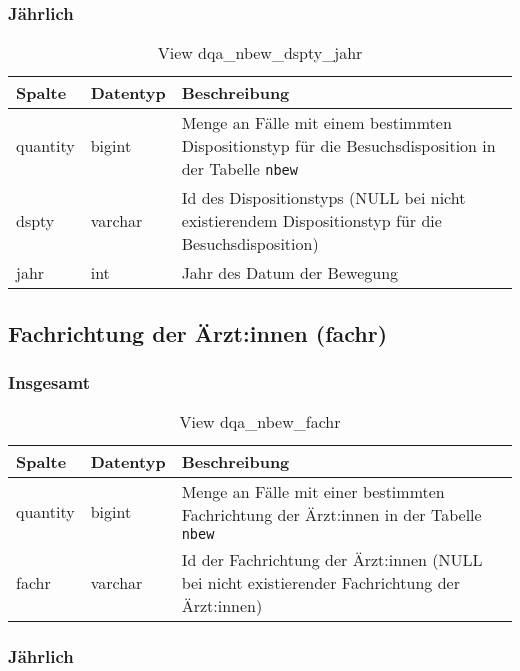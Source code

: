 \subsubsection{Jährlich} \label{subsubsec:bewDsptyJ}

\begin{table}[ht]
	\centering   
	\caption{View dqa\_nbew\_dspty\_jahr}
	\label{tab:bewDsptyJ}
	\begin{tabular}{||l|l|p{10cm}||}   		
		\hline
		Spalte & Datentyp & Beschreibung \\ [0.5ex]
		\hline\hline
		quantity & bigint & Menge an Fälle mit einem bestimmten Dispositionstyp für die Besuchsdisposition in der Tabelle \texttt{nbew}\\
		\hline
		dspty & varchar & Id des Dispositionstyps (NULL bei nicht existierendem Dispositionstyp für die Besuchsdisposition)\\
		\hline
		jahr & int &  Jahr des Datum der Bewegung \\
		\hline		
	\end{tabular}
\end{table}

\subsection{Fachrichtung der Ärzt:innen (fachr)} \label{subsec:bewFachr}

\subsubsection{Insgesamt} \label{subsubsec:bewFachrI}

\begin{table}[ht]
	\centering   
	\caption{View dqa\_nbew\_fachr}
	\label{tab:bewFachrI}
	\begin{tabular}{||l|l|p{10cm}||}   		
		\hline
		Spalte & Datentyp & Beschreibung \\ [0.5ex]
		\hline\hline
		quantity & bigint & Menge an Fälle mit einer bestimmten Fachrichtung der Ärzt:innen in der Tabelle \texttt{nbew} \\
		\hline
		fachr & varchar & Id der Fachrichtung der Ärzt:innen (NULL bei nicht existierender Fachrichtung der Ärzt:innen)\\
		\hline
		
	\end{tabular}
\end{table}

\subsubsection{Jährlich} \label{subsubsec:bewFachrJ}

